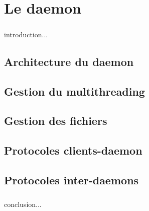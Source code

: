 
\chapter{Le daemon}

	\paragraph{}introduction...
	
	\section{Architecture du daemon}
	
	\section{Gestion du multithreading}
	
	\section{Gestion des fichiers}
	
	\section{Protocoles clients-daemon}
	
	\section{Protocoles inter-daemons}

	\paragraph*{}conclusion...
